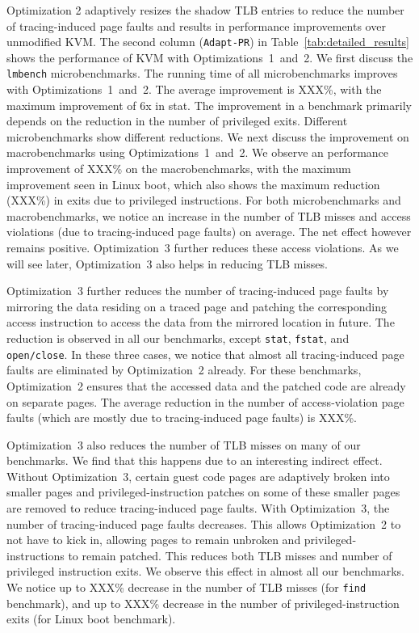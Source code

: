 \documentclass[10pt,twocolumn]{article}
\begin{document}
Optimization 2 adaptively resizes the shadow TLB entries to reduce
the number of tracing-induced page faults and results in
performance improvements over unmodified KVM. The second column ({\tt Adapt-PR})
in Table~\ref{tab:detailed_results} shows the performance of KVM with
Optimizations~1~and~2.
We first discuss the {\tt lmbench} microbenchmarks. The running time
of all microbenchmarks improves with Optimizations~1~and~2. The average improvement
is XXX\%, with the maximum improvement of 6x in stat. The improvement in
a benchmark primarily depends on the reduction in the number of privileged exits.
Different microbenchmarks show different reductions.
We next discuss the improvement on macrobenchmarks using Optimizations~1~and~2.
We observe an performance improvement of XXX\% on the macrobenchmarks, with the
maximum improvement seen in Linux boot, which also shows the maximum reduction
(XXX\%) in exits due to privileged instructions.
For both microbenchmarks and macrobenchmarks, we notice an increase in the
number of TLB misses and access violations (due to tracing-induced page faults)
on average. The net effect however remains positive. Optimization~3 further
reduces these access violations. As we will see later, Optimization~3 also helps
in reducing TLB misses.

Optimization~3 further reduces the number of tracing-induced page faults
by mirroring the data residing on a traced page and patching the corresponding
access instruction to access the data from the mirrored location in future.
The reduction is observed in all our benchmarks, except {\tt stat}, {\tt fstat},
and {\tt open/close}. In these three cases, we notice that
almost all tracing-induced page faults are eliminated by Optimization~2 already.
For these benchmarks, Optimization~2 ensures that the accessed data and the
patched code are already on separate pages. The average reduction in the number
of access-violation page faults (which are mostly due to tracing-induced
page faults) is XXX\%.

Optimization~3 also reduces the number of TLB misses on many of our benchmarks.
We find that this happens due to an interesting indirect effect.
Without Optimization~3, certain guest code pages are adaptively broken into smaller pages
and privileged-instruction patches on some of these smaller pages are removed to reduce
tracing-induced page faults. With Optimization~3, the number of tracing-induced
page faults decreases. This allows Optimization~2 to not have to kick in, allowing
pages to remain unbroken and privileged-instructions to remain patched.
This reduces both TLB misses and number of privileged instruction exits.
We observe this effect in almost all our benchmarks. We notice up to
XXX\% decrease in the number of TLB misses (for {\tt find} benchmark),
and up to XXX\% decrease in the number of privileged-instruction
exits (for Linux boot benchmark).
\end{document}
